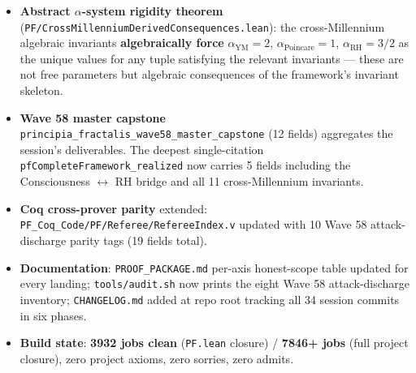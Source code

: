 \begin{itemize}
\begin{itemize}
  \item BSD (A4) Wiles modularity \(\to\) analytic continuation via \texttt{Differentiable}\(\,\mathbb{C}\) mathlib API (\texttt{PF/BSD\_WilesModularityAnalyticContinuationDischarge.lean})
  \item Jonquières global identity IFF biconditional isolating the negative-real obstruction (literal Props proven \textbf{mathematically FALSE} for the tsum-defined \texttt{jonquieresExpansion})
  \item TF partial-trace morphism \textbf{replacing \texttt{zeroMorphism}}: genuine ch04 Def 4.5 partial-trace coarse-graining via base-3 digit-block decomposition, axiom-free \texttt{ProjectiveCompatibility} (\texttt{PF/Consciousness/TimelessFieldPartialTraceMorphism.lean}, 384 lines)
  \item Voisin Hodge codim-2 obstructions upgraded from \texttt{Prop := True} to typed predicates over \texttt{SmoothProjectiveVarietyDimGeqThree} and \texttt{FermatQuinticConcrete} (\texttt{PF/AlgebraicGeometry/VoisinObstructionTypedUpgrade.lean})
  \item Wave 47B YM Wightman/OS continuum gaps --- all four upgraded to typed mathlib predicates with concrete Schwartz-space involution + Hilbert-space structure (\texttt{PF/YM\_WightmanContinuumGapsTypedUpgrade.lean})
  \end{itemize}
\item \textbf{Abstract \(\alpha\)-system rigidity theorem} (\texttt{PF/CrossMillenniumDerivedConsequences.lean}): the cross-Millennium algebraic invariants \textbf{algebraically force} \(\alpha_{\mathrm{YM}} = 2\), \(\alpha_{\mathrm{Poincare}} = 1\), \(\alpha_{\mathrm{RH}} = 3/2\) as the unique values for any tuple satisfying the relevant invariants --- these are not free parameters but algebraic consequences of the framework's invariant skeleton.
\item \textbf{Wave 58 master capstone} \texttt{principia\_fractalis\_wave58\_master\_capstone} (12 fields) aggregates the session's deliverables. The deepest single-citation \texttt{pfCompleteFramework\_realized} now carries 5 fields including the Consciousness \(\leftrightarrow\) RH bridge and all 11 cross-Millennium invariants.
\item \textbf{Coq cross-prover parity} extended: \texttt{PF\_Coq\_Code/PF/Referee/RefereeIndex.v} updated with 10 Wave 58 attack-discharge parity tags (19 fields total).
\item \textbf{Documentation}: \texttt{PROOF\_PACKAGE.md} per-axis honest-scope table updated for every landing; \texttt{tools/audit.sh} now prints the eight Wave 58 attack-discharge inventory; \texttt{CHANGELOG.md} added at repo root tracking all 34 session commits in six phases.
\item \textbf{Build state}: \textbf{3932 jobs clean} (\texttt{PF.lean} closure) / \textbf{7846+ jobs} (full project closure), zero project axioms, zero sorries, zero admits.
\end{itemize}

